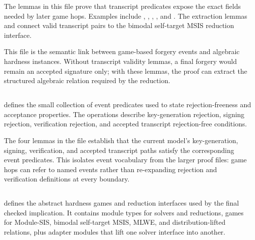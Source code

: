 The lemmas in this file prove that transcript predicates expose the exact fields
needed by later game hops.  Examples include
,
,
,
, and
.  The extraction lemmas
 and
 connect valid transcript pairs to
the bimodal self-target MSIS reduction interface.

This file is the semantic link between game-based forgery events and algebraic
hardness instances.  Without transcript validity lemmas, a final forgery would
remain an accepted signature only; with these lemmas, the proof can extract the
structured algebraic relation required by the reduction.

\subsection[HAETAE\_Events.ec]{\texorpdfstring{}{HAETAE\_Events.ec}}

 defines the small collection of event predicates used
to state rejection-freeness and acceptance properties.  The operations describe
key-generation rejection, signing rejection, verification rejection, and accepted
transcript rejection-free conditions.

The four lemmas in the file establish that the current model's key-generation,
signing, verification, and accepted transcript paths satisfy the corresponding
event predicates.  This isolates event vocabulary from the larger proof files:
game hops can refer to named events rather than re-expanding rejection and
verification definitions at every boundary.

\subsection[HAETAE\_Assumptions.ec]{\texorpdfstring{}{HAETAE\_Assumptions.ec}}

 defines the abstract hardness games and
reduction interfaces used by the final checked implication.  It contains module types for
solvers and reductions, games for Module-SIS, bimodal self-target MSIS, MLWE,
and distribution-lifted relations, plus adapter modules that lift one solver
interface into another.

